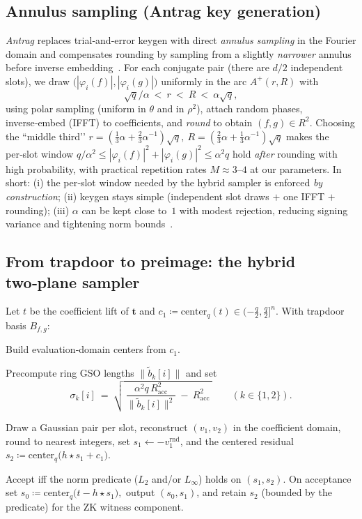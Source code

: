 \subsection{Annulus sampling (Antrag key generation)}
\label{subsec:antrag}

\emph{Antrag} replaces trial‑and‑error keygen with direct \emph{annulus sampling} in the Fourier domain and compensates rounding by sampling from a slightly \emph{narrower} annulus before inverse embedding~\cite{cryptoeprint:2023/1335}. For each conjugate pair (there are $d/2$ independent slots), we draw $\big(|\varphi_i(f)|,|\varphi_i(g)|\big)$ uniformly in the arc $A^+(r,R)$ with
\[
  \sqrt{q}/\alpha \ <\ r \ <\ R \ <\ \alpha\sqrt{q},
\]
using polar sampling (uniform in $\theta$ and in $\rho^2$), attach random phases, inverse‑embed (IFFT) to coefficients, and \emph{round} to obtain $(f,g)\in R^2$. Choosing the “middle third’’
\(
r=(\tfrac{1}{3}\alpha+\tfrac{2}{3}\alpha^{-1})\sqrt{q},\
R=(\tfrac{2}{3}\alpha+\tfrac{1}{3}\alpha^{-1})\sqrt{q}
\)
makes the per‑slot window
\(
q/\alpha^2 \le |\varphi_i(f)|^2+|\varphi_i(g)|^2 \le \alpha^2 q
\)
hold \emph{after} rounding with high probability, with practical repetition rates $M\approx 3$–$4$ at our parameters. In short: (i) the per‑slot window needed by the hybrid sampler is enforced \emph{by construction}; (ii) keygen stays simple (independent slot draws $+$ one IFFT $+$ rounding); (iii) $\alpha$ can be kept close to~$1$ with modest rejection, reducing signing variance and tightening norm bounds~\cite{cryptoeprint:2023/1335}.

\subsection{From trapdoor to preimage: the hybrid two‑plane sampler}
\label{subsec:hybrid-sampler}

Let $t$ be the coefficient lift of $\mathbf{t}$ and $c_1\coloneqq \mathrm{center}_q(t)\in(-\frac{q}{2},\frac{q}{2}]^n$. With trapdoor basis $B_{f,g}$:
\begin{description}[leftmargin=1.25em]
  \item[Centers.] Build evaluation‑domain centers from $c_1$.
  \item[Per‑slot widths.] Precompute ring GSO lengths $\|\widetilde{b}_k[i]\|$ and set
  \[
    \sigma_k[i]\ =\ \sqrt{\ \frac{\alpha^2 q\,R_{\mathrm{acc}}^2}{\|\widetilde{b}_k[i]\|^2}\ -\ R_{\mathrm{acc}}^2\ }\qquad(k\in\{1,2\}).
  \]
  \item[Draw, round, residual.] Draw a Gaussian pair per slot, reconstruct $(v_1,v_2)$ in the coefficient domain, round to nearest integers, set $s_1\gets -v_1^{\text{rnd}}$, and the centered residual
  \(
  s_2 \coloneqq \mathrm{center}_q\big(h\star s_1 + c_1\big).
  \)
  \item[Accept.] Accept iff the norm predicate ($L_2$ and/or $L_\infty$) holds on $(s_1,s_2)$. On acceptance set
  \(
  s_0\coloneqq \mathrm{center}_q\big(t - h\star s_1\big),
  \)
  output $(s_0,s_1)$, and retain $s_2$ (bounded by the predicate) for the ZK witness component.
\end{description}


